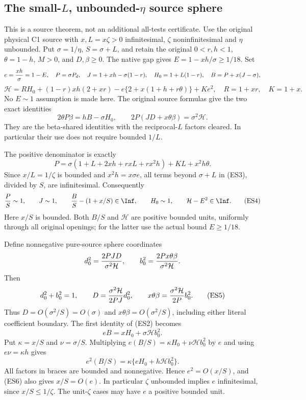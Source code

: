 \subsection{The small-$L$, unbounded-$\eta$ source sphere}

\label{component:p66922bb7f235}

\label{p66922bb7f235:sec:r13-small-L-eta-large-bounds}

This is a source theorem, not an additional all-tests certificate.
Use the original physical C1 source with $x,L=x\zeta>0$
infinitesimal, $\zeta$ noninfinitesimal and $\eta$ unbounded.
Put $\sigma=1/\eta$, $S=\sigma+L$, and retain the original
$0<r,h<1$, $\theta=1-h$, $M>0$, and $D,\beta\ge0$.
The native gap gives $E=1-xh/\sigma\ge1/18$. Set
\[
 e={xh\over\sigma}=1-E,\quad
 P=\sigma P_d,\quad J=1+xh-\sigma(1-r),\quad
 H_0=1+L(1-r),\quad B=P+x(J-\sigma),
\]
\[
 \mathcal H=R H_0+(1-r)xh(2+xr)
 -e\{2+x(1+h+r\theta)\}+Ke^2,
 \quad R=1+xr,\quad K=1+x.                           \tag{ES1}
\]
No $E\sim1$ assumption is made here. The original source formulas
give the two exact identities
\[
 2\theta P\beta=hB-\sigma H_0,\qquad
 2P(JD+x\theta\beta)=\sigma^2\mathcal H.             \tag{ES2}
\]
They are the beta-shared identities with the reciprocal-$L$ factors
cleared. In particular their use does not require bounded $1/L$.

The positive denominator is exactly
\[
 P=\sigma(1+L+2xh+rxL+rx^2h)+KL+x^2h\theta.
                                                               \tag{ES3}
\]
Since $x/L=1/\zeta$ is bounded and $x^2h=x\sigma e$,
all terms beyond $\sigma+L$ in (ES3), divided by $S$, are
infinitesimal. Consequently
\[
 {P\over S}\sim1,\qquad J\sim1,\qquad
 {B\over S}-(1+x/S)\in\Inf,\qquad
 H_0\sim1,\qquad \mathcal H-E^2\in\Inf.             \tag{ES4}
\]
Here $x/S$ is bounded. Both $B/S$ and $\mathcal H$ are
positive bounded units, uniformly through all original openings;
for the latter use the actual bound $E\ge1/18$.

Define nonnegative pure-source sphere coordinates
\[
 d_0^2={2PJD\over\sigma^2\mathcal H},\qquad
 b_0^2={2Px\theta\beta\over\sigma^2\mathcal H}.
\]
Then
\[
 d_0^2+b_0^2=1,\qquad
 D={\sigma^2\mathcal H\over2PJ}d_0^2,\qquad
 x\theta\beta={\sigma^2\mathcal H\over2P}b_0^2.
                                                               \tag{ES5}
\]
Thus $D=O(\sigma^2/S)=O(\sigma)$ and
$x\theta\beta=O(\sigma^2/S)$, including either literal coefficient
boundary. The first identity of (ES2) becomes
\[
 eB=xH_0+\sigma\mathcal H b_0^2.                     \tag{ES6}
\]
Put $\kappa=x/S$ and $\nu=\sigma/S$. Multiplying
$e(B/S)=\kappa H_0+\nu\mathcal H b_0^2$ by $e$ and using
$e\nu=\kappa h$ gives
\[
 e^2(B/S)=\kappa\{eH_0+h\mathcal H b_0^2\}.
                                                               \tag{ES7}
\]
All factors in braces are bounded and nonnegative. Hence
$e^2=O(x/S)$, and (ES6) also gives $x/S=O(e)$.
In particular $\zeta$ unbounded implies $e$ infinitesimal,
since $x/S\le1/\zeta$. The unit-$\zeta$ cases may have
$e$ a positive bounded unit.


